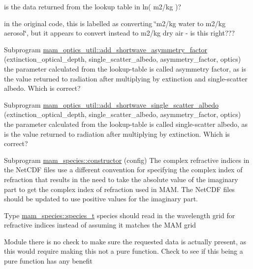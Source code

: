 \begin{DoxyRefList}
\label{todo__todo000008}%
%
is the data returned from the lookup table in ln( m2/kg )? 

\label{todo__todo000009}%
%
in the original code, this is labelled as converting \char`\"{}m2/kg  water to m2/kg aerosol\char`\"{}, but it appears to convert instead to m2/kg dry air -\/ is this right???  
\item[Subprogram \mbox{\hyperlink{namespacemam__optics__util_a0149038eae747d9b5e3809633415bab6}{mam\+\_\+optics\+\_\+util\+::add\+\_\+shortwave\+\_\+asymmetry\+\_\+factor}} (extinction\+\_\+optical\+\_\+depth, single\+\_\+scatter\+\_\+albedo, asymmetry\+\_\+factor, optics)]\label{todo__todo000013}%
%
the parameter calculated from the lookup-\/table is called asymmetry factor, as is the value returned to radiation after multiplying by extinction and single-\/scatter albedo. Which is correct?  
\item[Subprogram \mbox{\hyperlink{namespacemam__optics__util_a8b91778ceede0fba8cfe3ee54c8e2a6c}{mam\+\_\+optics\+\_\+util\+::add\+\_\+shortwave\+\_\+single\+\_\+scatter\+\_\+albedo}} (extinction\+\_\+optical\+\_\+depth, single\+\_\+scatter\+\_\+albedo, asymmetry\+\_\+factor, optics)]\label{todo__todo000012}%
%
the parameter calculated from the lookup-\/table is called single-\/scatter albedo, as is the value returned to radiation after multiplying by extinction. Which is correct?  
\item[Subprogram \mbox{\hyperlink{namespacemam__species_a1155acd61c6fe7c1c3192dd41b618b53}{mam\+\_\+species\+::constructor}} (config)]\label{todo__todo000015}%
%
The complex refractive indices in the Net\+CDF files use a different convention for specifying the complex index of refraction that results in the need to take the absolute value of the imaginary part to get the complex index of refraction used in MAM. The Net\+CDF files should be updated to use positive values for the imaginary part.  
\item[Type \mbox{\hyperlink{structmam__species_1_1species__t}{mam\+\_\+species\+::species\+\_\+t}} ]\label{todo__todo000014}%
%
species should read in the wavelength grid for refractive indices instead of assuming it matches the MAM grid  
\item[Module \mbox{\hyperlink{namespacemam__optics__lookup_amgrp01747264fe7bf50731df0522c351974e}{}} ]\label{todo__todo000011}%
%
there is no check to make sure the requested data is actually present, as this would require making this not a pure function. Check to see if this being a pure function has any benefit 
\end{DoxyRefList}